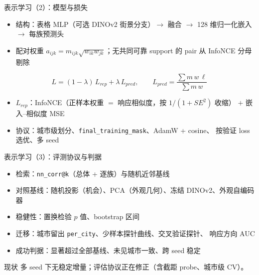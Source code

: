 \documentclass[aspectratio=169,11pt]{beamer}
\begin{document}
\begin{frame}{表示学习（2）：模型与损失}
  \small
  \begin{itemize}
    \item 结构：表格 MLP（可选 DINOv2 街景分支）$\to$ 融合 $\to$ 128 维归一化嵌入
      $\to$ 每族预测头
    \item 配对权重 $a_{ijk}=m_{ijk}\sqrt{w_{ik}w_{jk}}$；无共同可靠 support 的 pair
      从 InfoNCE 分母剔除
  \end{itemize}
  \[
    L=(1-\lambda)\,L_{rep}+\lambda\,L_{pred},\qquad
    L_{pred}=\frac{\sum m\,w\,\ell}{\sum m\,w}
  \]
  \begin{itemize}
    \item $L_{rep}$：InfoNCE（正样本权重 $=$ 响应相似度，按 $1/(1+SE^2)$ 收缩）
      $+$ 嵌入--相似度 MSE
    \item 协议：城市级划分、\texttt{final\_training\_mask}、AdamW + cosine、
      按验证 loss 选优、多 seed
  \end{itemize}
\end{frame}

\begin{frame}{表示学习（3）：评测协议与判据}
  \small
  \begin{itemize}
    \item 检索：\texttt{nn\_corr@k}（总体 + 逐族）与随机近邻基线
    \item 对照基线：随机投影（机会）、PCA（外观几何）、冻结 DINOv2、外观自编码器
    \item 稳健性：置换检验 $p$ 值、bootstrap 区间
    \item 迁移：城市留出 \texttt{per\_city}、少样本探针曲线、交叉验证探针、
      响应方向 AUC
    \item 成功判据：显著超过全部基线、未见城市一致、跨 seed 稳定
  \end{itemize}
  \medskip
  \begin{block}{现状}
    \small 多 seed 下无稳定增量；评估协议正在修正（含截距 probe、城市级 CV）。
  \end{block}
\end{frame}
\end{document}
